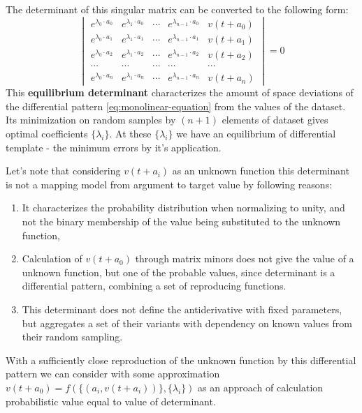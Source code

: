 \documentclass[a4paper, 11pt, oneside]{book}
\begin{document}
The determinant of this singular matrix can be converted to the following form:
\begin{equation}\label{eq:monolinear-f-pattern}
  \begin{vmatrix}
    e^{\lambda_0 \cdot a_0} & e^{\lambda_1 \cdot a_0} & \cdots & e^{\lambda_{n - 1} \cdot a_0} & v(t + a_0) \\
    e^{\lambda_0 \cdot a_1} & e^{\lambda_1 \cdot a_1} & \cdots & e^{\lambda_{n - 1} \cdot a_1} & v(t + a_1) \\
    e^{\lambda_0 \cdot a_2} & e^{\lambda_1 \cdot a_2} & \cdots & e^{\lambda_{n - 1} \cdot a_2} & v(t + a_2) \\
    \cdots & \cdots & \cdots & \cdots & \cdots \\
    e^{\lambda_0 \cdot a_n} & e^{\lambda_1 \cdot a_n} & \cdots & e^{\lambda_{n - 1} \cdot a_n} & v(t + a_n)
  \end{vmatrix}
  =0
\end{equation}
This \textbf{equilibrium determinant} characterizes the amount of space deviations of the differential pattern \ref{eq:monolinear-equation} from the values of the dataset. Its minimization on random samples by $(n + 1)$ elements of dataset gives optimal coefficients $\{\lambda_i\}$. At these $\{\lambda_i\}$ we have an equilibrium of differential template - the minimum errors by it's application.

Let's note that considering $v(t + a_i)$ as an unknown function this determinant is not a mapping model from argument to target value by following reasons:
\begin{enumerate}
  \item It characterizes the probability distribution when normalizing to unity, and not the binary membership of the value being substituted to the unknown function,
  \item Calculation of $v(t + a_0)$ through matrix minors does not give the value of a unknown function, but one of the probable values, since determinant is a differential pattern, combining a set of reproducing functions.
  \item This determinant does not define the antiderivative with fixed parameters, but aggregates a set of their variants with dependency on known values from their random sampling.
\end{enumerate}

With a sufficiently close reproduction of the unknown function by this differential pattern we can consider with some approximation $v(t + a_0) = f(\{(a_i, v(t+a_i))\}, \{\lambda_i\})$ as an approach of calculation probabilistic value equal to value of determinant.
\end{document}
